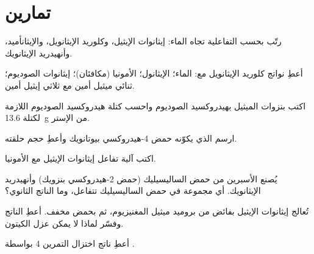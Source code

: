 \section{تمارين}

\begin{exercise}[$\star$]\label{exo:b2:acyl-substitution:1}
رتّب بحسب التفاعلية تجاه الماء: إيثانوات الإيثيل، وكلوريد الإيثانويل، والإيثانأميد، وأنهيدريد
الإيثانويك.
\end{exercise}

\begin{exercise}[$\star$]\label{exo:b2:acyl-substitution:2}
أعطِ نواتج كلوريد الإيثانويل مع: الماء؛ الإيثانول؛ الأمونيا (مكافئان)؛
إيثانوات الصوديوم؛ ثنائي ميثيل أمين مع ثلاثي إيثيل أمين.
\end{exercise}

\begin{exercise}[$\star$]\label{exo:b2:acyl-substitution:3}
اكتب  بنزوات الميثيل بهيدروكسيد الصوديوم واحسب كتلة هيدروكسيد
الصوديوم اللازمة لكتلة \qty{13.6}{g} من الإستر.
\end{exercise}

\begin{exercise}[$\star$]\label{exo:b2:acyl-substitution:4}
ارسم  الذي يكوّنه حمض 4-هيدروكسي بيوتانويك وأعطِ حجم حلقته.
\end{exercise}

\begin{exercise}[$\star\star$]\label{exo:b2:acyl-substitution:5}
اكتب آلية تفاعل إيثانوات الإيثيل مع الأمونيا.
\end{exercise}

\begin{exercise}[$\star\star$]\label{exo:b2:acyl-substitution:6}
يُصنع الأسبرين من حمض الساليسيليك (حمض 2-هيدروكسي بنزويك) وأنهيدريد الإيثانويك. أي مجموعة
في حمض الساليسيليك تتفاعل، وما الناتج الثانوي؟
\end{exercise}

\begin{exercise}[$\star\star$]\label{exo:b2:acyl-substitution:7}
تُعالج إيثانوات الإيثيل بفائض من بروميد ميثيل المغنيزيوم، ثم بحمض مخفف. أعطِ
الناتج وفسّر لماذا لا يمكن عزل الكيتون.
\end{exercise}

\begin{exercise}[$\star\star$]\label{exo:b2:acyl-substitution:8}
أعطِ ناتج اختزال  التمرين 4 بواسطة .
\end{exercise}

